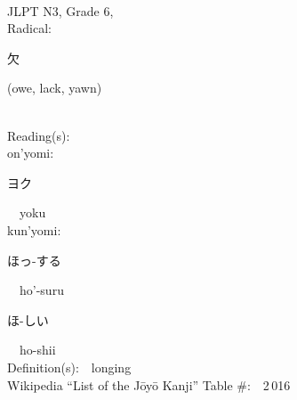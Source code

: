 \begin{multicols}{2}
{\fontsize{34pt}{40pt}  }\ \ \\  %
{JLPT N3, Grade 6, \\Radical:\ \ {\begin{CJK}{UTF8}{min} 欠 \end{CJK}} (owe, lack, yawn) } \\
Reading(s):\ \ \\
{\hspace*{1em}}on'yomi:\ \ \\
{\hspace*{2em}}{\begin{CJK}{UTF8}{min} ヨク \end{CJK}}\ \ yoku\ \ \\
{\hspace*{1em}}kun'yomi:\ \ \\
{\hspace*{2em}}{\begin{CJK}{UTF8}{min} ほっ-する \end{CJK}}\ \ ho'-suru\ \ \\
{\hspace*{2em}}{\begin{CJK}{UTF8}{min} ほ-しい \end{CJK}}\ \ ho-shii\ \ \\
Definition(s):\ \ longing \\
Wikipedia ``List of the J\=oy\=o Kanji'' Table \#:\ \ 2\,016 \\
\ \ \\
\end{multicols}



